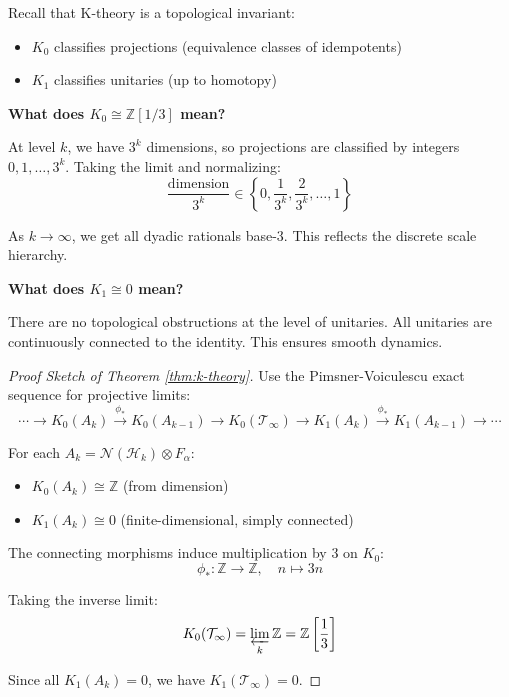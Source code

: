 \begin{level2}
Recall that K-theory is a topological invariant:
\begin{itemize}
\item $K_0$ classifies projections (equivalence classes of idempotents)
\item $K_1$ classifies unitaries (up to homotopy)
\end{itemize}

\textbf{What does $K_0 \cong \mathbb{Z}[1/3]$ mean?}

At level $k$, we have $3^k$ dimensions, so projections are classified by integers $0, 1, \ldots, 3^k$. Taking the limit and normalizing:
\begin{equation}
\frac{\text{dimension}}{3^k} \in \left\{0, \frac{1}{3^k}, \frac{2}{3^k}, \ldots, 1\right\}
\end{equation}

As $k \to \infty$, we get all dyadic rationals base-3. This reflects the discrete scale hierarchy.

\textbf{What does $K_1 \cong 0$ mean?}

There are no topological obstructions at the level of unitaries. All unitaries are continuously connected to the identity. This ensures smooth dynamics.
\end{level2}

\begin{proof}[Proof Sketch of Theorem \ref{thm:k-theory}]
Use the Pimsner-Voiculescu exact sequence for projective limits\cite{rordam_classification_2002}:
\begin{equation}
\cdots \to K_0(A_k) \xrightarrow{\phi_*} K_0(A_{k-1}) \to K_0(\mathcal{T}_\infty) \to K_1(A_k) \xrightarrow{\phi_*} K_1(A_{k-1}) \to \cdots
\end{equation}

For each $A_k = \mathcal{N}(\mathcal{H}_k) \otimes F_\alpha$:
\begin{itemize}
\item $K_0(A_k) \cong \mathbb{Z}$ (from dimension)
\item $K_1(A_k) \cong 0$ (finite-dimensional, simply connected)
\end{itemize}

The connecting morphisms induce multiplication by $3$ on $K_0$:
\begin{equation}
\phi_*: \mathbb{Z} \to \mathbb{Z}, \quad n \mapsto 3n
\end{equation}

Taking the inverse limit:
\begin{equation}
K_0(\mathcal{T}_\infty) = \varprojlim_k \mathbb{Z} = \mathbb{Z}\left[\frac{1}{3}\right]
\end{equation}

Since all $K_1(A_k) = 0$, we have $K_1(\mathcal{T}_\infty) = 0$.
\end{proof}

